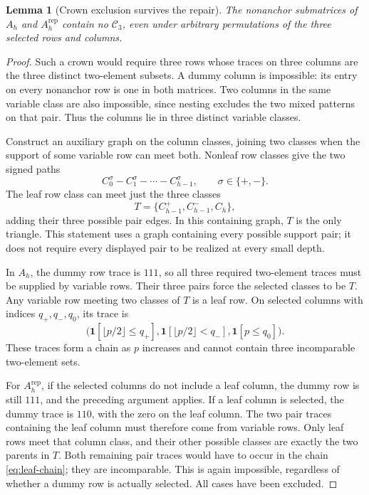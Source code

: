 \documentclass[11pt]{article}
\newtheorem{lemma}[theorem]{Lemma}
\theoremstyle{definition}
\newcommand{\one}{\mathbf 1}
\newcommand{\crown}{\mathcal C}
\begin{document}
\begin{lemma}[Crown exclusion survives the repair]
\label{lem:crown}
The nonanchor submatrices of \(A_h\) and \(A_h^{\mathrm{rep}}\)
contain no \(\crown_3\), even under arbitrary permutations of the three
selected rows and columns.
\end{lemma}
\begin{proof}
Such a crown would require three rows whose traces on three columns
are the three distinct two-element subsets. A dummy column is impossible:
its entry on every nonanchor row is one in both matrices. Two columns
in the same variable class are also impossible, since nesting excludes
the two mixed patterns on that pair. Thus the columns lie in three
distinct variable classes.

Construct an auxiliary graph on the column classes, joining two classes
when the support of some variable row can meet both. Nonleaf row classes
give the two signed paths
\[
 C_0^\sigma-C_1^\sigma-\cdots-C_{h-1}^\sigma,
 \qquad \sigma\in\{+,-\}.
\]
The leaf row class can meet just the three classes
\begin{equation}
 T=\{C_{h-1}^+,C_{h-1}^-,C_h\},
 \label{eq:terminal-triangle}
\end{equation}
adding their three possible pair edges. In this containing graph, \(T\)
is the only triangle. This statement uses a graph containing every
possible support pair; it does not require every displayed pair to be
realized at every small depth.

In \(A_h\), the dummy row trace is \(111\), so all three required
two-element traces must be supplied by variable rows. Their three pairs
force the selected classes to be \(T\). Any variable row meeting two
classes of \(T\) is a leaf row. On selected columns with indices
\(q_+,q_-,q_0\), its trace is
\begin{equation}
 \bigl(\one[\lfloor p/2\rfloor\le q_+],
       \one[\lfloor p/2\rfloor<q_-],
       \one[p\le q_0]\bigr).
 \label{eq:leaf-chain}
\end{equation}
These traces form a chain as \(p\) increases and cannot contain three
incomparable two-element sets.

For \(A_h^{\mathrm{rep}}\), if the selected columns do not include a
leaf column, the dummy row is still \(111\), and the preceding argument
applies. If a leaf column is selected, the dummy trace is \(110\),
with the zero on the leaf column. The two pair traces containing the
leaf column must therefore come from variable rows. Only leaf rows
meet that column class, and their other possible classes are exactly
the two parents in \(T\). Both remaining pair traces would have to
occur in the chain \eqref{eq:leaf-chain}; they are incomparable. This
is again impossible, regardless of whether a dummy row is actually
selected. All cases have been excluded.
\end{proof}
\end{document}
